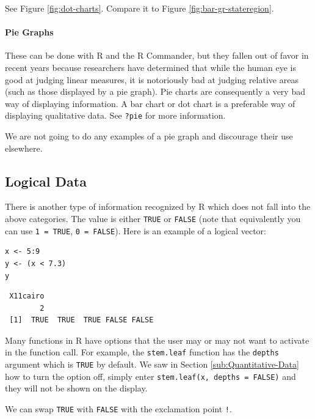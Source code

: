 \documentclass[captions=tableheading]{scrbook}
\begin{document}
\begin{example}
See Figure \ref{fig:dot-charts}. Compare it to Figure \ref{fig:bar-gr-stateregion}.

\end{example}

\paragraph*{Pie Graphs}
\label{par:Pie-Graphs}

These can be done with \textsf{R} and the \textsf{R} Commander, but they fallen out of favor in recent years because researchers have determined that while the human eye is good at judging linear measures, it is notoriously bad at judging relative areas (such as those displayed by a pie graph). Pie charts are consequently a very bad way of displaying information. A bar chart or dot chart is a preferable way of displaying qualitative data. See \texttt{?pie} for more information.

We are not going to do any examples of a pie graph and discourage their use elsewhere. 
\subsection{Logical Data}
\label{sec-3-1-5}

\label{sub:Logical-Data}

There is another type of information recognized by \textsf{R} which does not fall into the above categories. The value is either \texttt{TRUE} or \texttt{FALSE} (note that equivalently you can use \texttt{1 = TRUE}, \texttt{0 = FALSE}). Here is an example of a logical vector:


\begin{verbatim}
x <- 5:9
y <- (x < 7.3)
y
\end{verbatim}

\begin{verbatim}
 X11cairo 
        2
 [1]  TRUE  TRUE  TRUE FALSE FALSE
\end{verbatim}

Many functions in \textsf{R} have options that the user may or may not want to activate in the function call. For example, the \texttt{stem.leaf} function has the \texttt{depths} argument which is \texttt{TRUE} by default. We saw in Section \ref{sub:Quantitative-Data} how to turn the option off, simply enter \texttt{stem.leaf(x, depths = FALSE)} and they will not be shown on the display.

We can swap \texttt{TRUE} with \texttt{FALSE} with the exclamation point \texttt{!}.
\end{document}

